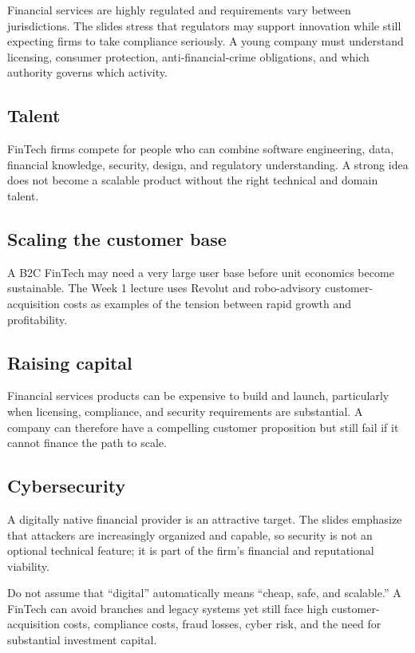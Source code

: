 Financial services are highly regulated and requirements vary between jurisdictions. The slides stress that regulators may support innovation while still expecting firms to take compliance seriously. A young company must understand licensing, consumer protection, anti-financial-crime obligations, and which authority governs which activity.

\subsection{Talent}

FinTech firms compete for people who can combine software engineering, data, financial knowledge, security, design, and regulatory understanding. A strong idea does not become a scalable product without the right technical and domain talent.

\subsection{Scaling the customer base}

A B2C FinTech may need a very large user base before unit economics become sustainable. The Week 1 lecture uses Revolut and robo-advisory customer-acquisition costs as examples of the tension between rapid growth and profitability.

\subsection{Raising capital}

Financial services products can be expensive to build and launch, particularly when licensing, compliance, and security requirements are substantial. A company can therefore have a compelling customer proposition but still fail if it cannot finance the path to scale.

\subsection{Cybersecurity}

A digitally native financial provider is an attractive target. The slides emphasize that attackers are increasingly organized and capable, so security is not an optional technical feature; it is part of the firm's financial and reputational viability.

\begin{pitfall}
Do not assume that ``digital'' automatically means ``cheap, safe, and scalable.'' A FinTech can avoid branches and legacy systems yet still face high customer-acquisition costs, compliance costs, fraud losses, cyber risk, and the need for substantial investment capital.
\end{pitfall}

